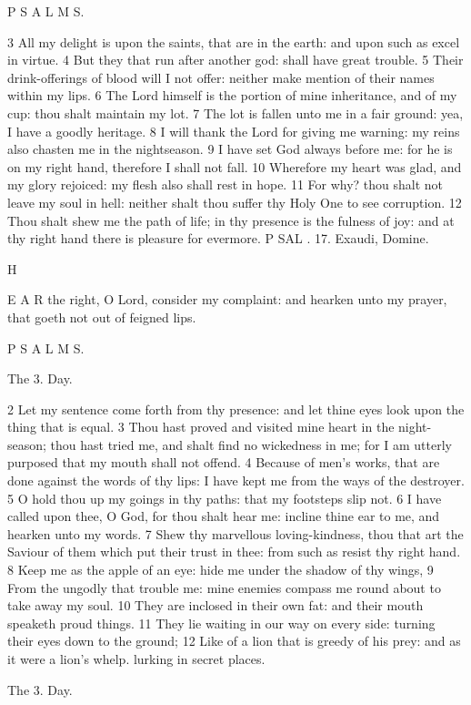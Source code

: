 P S A L M S.

3 All my delight is upon the saints, that are in the earth: and upon such as excel in virtue. 4 But they that run after another god: shall have great trouble. 5 Their drink-offerings of blood will I not offer: neither make mention of their names within my lips. 6 The Lord himself is the portion of mine inheritance, and of my cup: thou shalt maintain my lot. 7 The lot is fallen unto me in a fair ground: yea, I have a goodly heritage. 8 I will thank the Lord for giving me warning: my reins also chasten me in the nightseason. 9 I have set God always before me: for he is on my right hand, therefore I shall not fall. 10 Wherefore my heart was glad, and my glory rejoiced: my flesh also shall rest in hope. 11 For why? thou shalt not leave my soul in hell: neither shalt thou suffer thy Holy One to see corruption. 12 Thou shalt shew me the path of life; in thy presence is the fulness of joy: and at thy right hand there is pleasure for evermore. P SAL . 17. Exaudi, Domine.

H

E A R the right, O Lord, consider my complaint: and hearken unto my prayer, that goeth not out of feigned lips.

P S A L M S.

The 3. Day.

2 Let my sentence come forth from thy presence: and let thine eyes look upon the thing that is equal. 3 Thou hast proved and visited mine heart in the night-season; thou hast tried me, and shalt find no wickedness in me; for I am utterly purposed that my mouth shall not offend. 4 Because of men’s works, that are done against the words of thy lips: I have kept me from the ways of the destroyer. 5 O hold thou up my goings in thy paths: that my footsteps slip not. 6 I have called upon thee, O God, for thou shalt hear me: incline thine ear to me, and hearken unto my words. 7 Shew thy marvellous loving-kindness, thou that art the Saviour of them which put their trust in thee: from such as resist thy right hand. 8 Keep me as the apple of an eye: hide me under the shadow of thy wings, 9 From the ungodly that trouble me: mine enemies compass me round about to take away my soul. 10 They are inclosed in their own fat: and their mouth speaketh proud things. 11 They lie waiting in our way on every side: turning their eyes down to the ground; 12 Like of a lion that is greedy of his prey: and as it were a lion's whelp. lurking in secret places.

The 3. Day.

